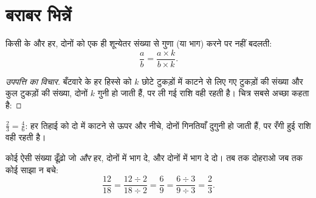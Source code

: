 \section{बराबर भिन्नें}

\begin{proposition}[तुल्य भिन्नें]\label{prop:g6:fractions:equal}
किसी  के  और हर, दोनों को एक ही शून्येतर संख्या से गुणा
(या भाग) करने पर  नहीं बदलती:
\[
\frac{a}{b} = \frac{a \times k}{b \times k} .
\]
\end{proposition}

\begin{proof}[उपपत्ति का विचार]
बँटवारे के हर हिस्से को $k$ छोटे टुकड़ों में काटने से लिए गए
टुकड़ों की संख्या और कुल टुकड़ों की संख्या, दोनों $k$ गुनी हो
जाती हैं, पर ली गई राशि वही रहती है। चित्र सबसे अच्छा कहता है:
\end{proof}

\begin{omfigure}

{\small $\frac23 = \frac46$: हर तिहाई को दो में काटने से ऊपर और
नीचे, दोनों गिनतियाँ दुगुनी हो जाती हैं, पर रँगी हुई राशि वही रहती है।}
\end{omfigure}

\begin{method}[भिन्न को सरल बनाना]\label{met:g6:fractions:simplify}
कोई ऐसी संख्या ढूँढ़ो जो  \emph{और} हर, दोनों में भाग दे, और
दोनों में भाग दे दो। तब तक दोहराओ जब तक कोई साझा  न बचे:
\[
\frac{12}{18} = \frac{12 \div 2}{18 \div 2} = \frac{6}{9}
= \frac{6 \div 3}{9 \div 3} = \frac{2}{3}.
\]
\end{method}

